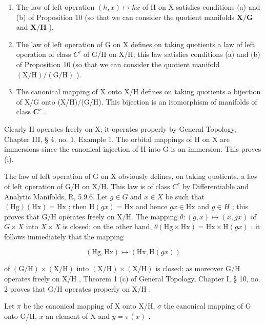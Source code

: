 \begin{enumerate}
\def\labelenumi{(\roman{enumi})}
\item
  The law of left operation \((h, x) \mapsto hx\) of H on X satisfies conditions (a) and (b) of Proposition 10 (so that we can consider the quotient manifolds \(\mathbf{X} / \mathbf{G}\) and \(\mathbf{X} / \mathbf{H}\) ).
\item
  The law of left operation of G on X defines on taking quotients a law of left operation of class \(C^{r}\) of G/H on X/H; this law satisfies conditions (a) and (b) of Proposition 10 (so that we can consider the quotient manifold \((\mathrm{X}/\mathrm{H})/(\mathrm{G}/\mathrm{H})\) ).
\item
  The canonical mapping of X onto X/H defines on taking quotients a bijection of X/G onto (X/H)/(G/H). This bijection is an isomorphism of manifolds of class \(\mathbf{C}^r\) .
\end{enumerate}

Clearly H operates freely on X; it operates properly by General Topology, Chapter III, § 4, no. 1, Example 1. The orbital mappings of H on X are immersions since the canonical injection of H into G is an immersion. This proves (i).

The law of left operation of G on X obviously defines, on taking quotients, a law of left operation of G/H on X/H. This law is of class \(C^{r}\) by Differentiable and Analytic Manifolds, R, 5.9.6. Let \(g \in G\) and \(x \in X\) be such that \((\mathrm{Hg})(\mathrm{Hx}) = \mathrm{Hx}\) ; then \(\mathrm{H}(gx) = \mathrm{Hx}\) and hence \(gx \in \mathrm{Hx}\) and \(g \in H\) ; this proves that G/H operates freely on X/H. The mapping \(\theta: (g, x) \mapsto (x, gx)\) of \(G \times X\) into \(X \times X\) is closed; on the other hand, \(\theta(\mathrm{Hg} \times \mathrm{Hx}) = \mathrm{Hx} \times \mathrm{H}(gx)\) ; it follows immediately that the mapping

\[
(\mathrm{Hg}, \mathrm{Hx}) \mapsto (\mathrm{Hx}, \mathrm{H} (g x))
\]

of \((\mathrm{G / H})\times (\mathrm{X / H})\) into \((\mathrm{X / H})\times (\mathrm{X / H})\) is closed; as moreover \(\mathrm{G / H}\) operates freely on \(\mathrm{X / H}\) , Theorem 1 (c) of General Topology, Chapter I, § 10, no. 2 proves that \(\mathrm{G / H}\) operates properly on \(\mathrm{X / H}\) .

Let \(\pi\) be the canonical mapping of X onto X/H, \(\sigma\) the canonical mapping of G onto G/H, \(x\) an element of X and \(y = \pi(x)\) .

